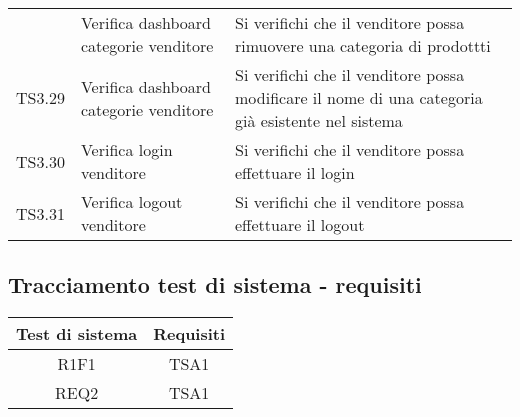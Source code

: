\begin{center}
\begin{longtable}{|p{1cm}|p{6.85cm}|p{7cm}|}
\begin{longtable}{p{1cm}|p{6.85cm}|p{7cm}|}
	TS3.28 & Verifica dashboard categorie venditore & Si verifichi che il venditore possa rimuovere una categoria di prodottti \\
	TS3.29 & Verifica dashboard categorie venditore & Si verifichi che il venditore possa modificare il nome di una categoria già esistente nel sistema \\
	TS3.30 & Verifica login venditore & Si verifichi che il venditore possa effettuare il login \\
	TS3.31 & Verifica logout venditore & Si verifichi che il venditore possa effettuare il logout \\
	\hline

	\end{longtable}
\end{center}


\subsection{Tracciamento test di sistema - requisiti}

\begin{center}
	\begin{longtable}{|c|c|}
	\hline
	\rowcolor{lighter-grayer}
	\textbf{Test di sistema} & \textbf{Requisiti} \\
	\hline
	\endfirsthead



	\hline
	R1F1 & TSA1  \\
	REQ2 & TSA1 \\
	
	\hline
	
	

	\hline

	\end{longtable}
\end{center}

